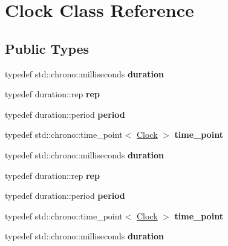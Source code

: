\hypertarget{struct_clock}{}\section{Clock Class Reference}
\label{struct_clock}
\subsection*{Public Types}
\begin{DoxyCompactItemize}
\item 
\mbox{\label{struct_clock_a795730dd7c32330c2e247269ce99ebfd}} 
typedef std\+::chrono\+::milliseconds {\bfseries duration}
\item 
\mbox{\label{struct_clock_aacf3506bbc1d04f6f89c663c83020d78}} 
typedef duration\+::rep {\bfseries rep}
\item 
\mbox{\label{struct_clock_a051e087c3a00ba40aa6dffc24d93f041}} 
typedef duration\+::period {\bfseries period}
\item 
\mbox{\label{struct_clock_a11d12a0f1b544dc4b571e9f62df03680}} 
typedef std\+::chrono\+::time\+\_\+point$<$ \mbox{\hyperlink{struct_clock}{Clock}} $>$ {\bfseries time\+\_\+point}
\item 
\mbox{\label{struct_clock_a795730dd7c32330c2e247269ce99ebfd}} 
typedef std\+::chrono\+::milliseconds {\bfseries duration}
\item 
\mbox{\label{struct_clock_aacf3506bbc1d04f6f89c663c83020d78}} 
typedef duration\+::rep {\bfseries rep}
\item 
\mbox{\label{struct_clock_a051e087c3a00ba40aa6dffc24d93f041}} 
typedef duration\+::period {\bfseries period}
\item 
\mbox{\label{struct_clock_a11d12a0f1b544dc4b571e9f62df03680}} 
typedef std\+::chrono\+::time\+\_\+point$<$ \mbox{\hyperlink{struct_clock}{Clock}} $>$ {\bfseries time\+\_\+point}
\item 
\mbox{\label{struct_clock_a795730dd7c32330c2e247269ce99ebfd}} 
typedef std\+::chrono\+::milliseconds {\bfseries duration}

\end{DoxyCompactItemize}
